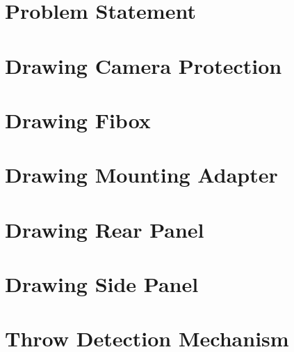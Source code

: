 \begin{appendix} 
  \section{Problem Statement}
  \label{app:problem_statement}
  

  \section{Drawing Camera Protection}
  \label{app:drawings_camera_protection}
  

  \section{Drawing Fibox}
  \label{app:drawings_fibox_bottom}
  

  \section{Drawing Mounting Adapter}
  \label{app:drawings_mounting_adapter}
  

  \section{Drawing Rear Panel}
  \label{app:drawings_rear_panel}
  

  \section{Drawing Side Panel}
  \label{app:drawings_side_panel}
  

  \section{Throw Detection Mechanism}
  \label{app:throw_detection_mechanism}
  
\end{appendix}
